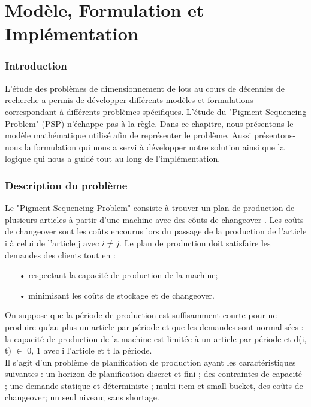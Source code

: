 \documentclass[12pt,a4paper]{article}
\begin{document}
	\newpage
	
	\part{Modèle, Formulation et Implémentation}
		\section*{Introduction}
		L'étude des problèmes de dimensionnement de lots au cours de décennies de recherche a permis de développer différents modèles et formulations correspondant à différents problèmes spécifiques. L'étude du "Pigment Sequencing Problem" (PSP) n'échappe pas à la règle. Dans ce chapitre, nous présentons le modèle mathématique utilisé afin de représenter le problème. Aussi présentons-nous la formulation qui nous a servi à développer notre solution ainsi que la logique qui nous a guidé tout au long de l'implémentation.
		
		\section{Description du problème}
		
		Le "Pigment Sequencing Problem" consiste à trouver un plan de production
de plusieurs articles à partir d’une machine avec des côuts de changeover . Les
coûts de changeover sont les coûts encourus lors du passage de la production
de l’article i à celui de l’article j avec $i \neq j$. Le plan de production doit
satisfaire les demandes des clients tout en :
	\begin{itemize}
		\item[•] respectant la capacité de production de la machine;
		\item[•] minimisant les coûts de stockage et de changeover.
	\end{itemize}
	\hspace*{.5cm} On suppose que la période de production est suffisamment courte pour ne produire qu’au plus un article par période et que les demandes sont normalisées : la capacité de production de la machine est limitée à un article par
période et d(i, t) $ \in $ {0, 1} avec i l’article et t la période.\\
	\hspace*{.5cm} Il s’agit d’un problème de planification de production ayant les caractéristiques suivantes : un horizon de planification discret et fini ; des contraintes de capacité ; une demande statique et déterministe ; multi-item et small bucket, des coûts de changeover; un seul niveau; sans shortage.\\
\end{document}
